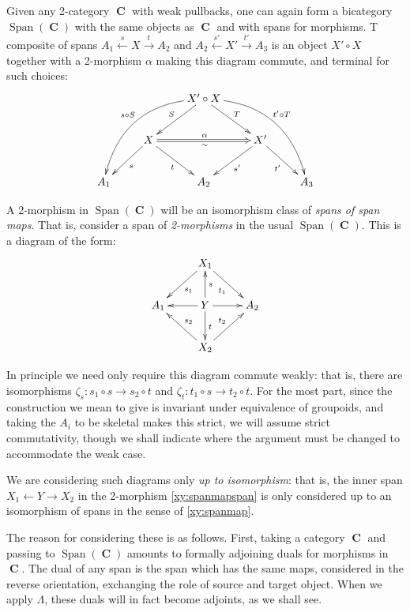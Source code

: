 \documentclass[10pt]{amsart}
\numberwithin{theorem}{subsection}
\newcommand{\ra}{\mathop{\rightarrow}}
\newcommand{\ralim}{\mathop{\ra}\limits}
\newcommand{\la}{\mathop{\leftarrow}}
\newcommand{\lalim}{\mathop{\la}\limits}
\newcommand{\opname}[1]{\operatorname{#1}}
\newcommand{\catname}[1]{\boldsymbol{\opname{{#1}}}}
\newcommand{\C}{\catname{C}}
\newcommand{\Span}{\opname{Span}}
\newcommand{\FV}{\Lambda}
\begin{document}
Given any 2-category $\C$ with weak pullbacks, one can again form a
bicategory $\Span(\C)$ with the same objects as $\C$ and with spans
for morphisms.  T composite of spans $A_1 \lalim^{s} X \ralim^{t} A_2$
and $A_2 \lalim^{s'} X' \ralim^{t'} A_3$ is an object $X' \circ X$
together with a 2-morphism $\alpha$ making this diagram commute, and
terminal for such choices:
\begin{equation}\label{xy:wkpb}
 \xymatrix{
   & & {X'\circ X} \ar_{S}[ld]\ar^{T}[rd]\ar@/_2pc/_{s \circ S}[ddll]\ar@/^2pc/^{t' \circ T}[ddrr] & & \\
   & {X}\ar^{s}[ld]\ar_{t}[rd] \ar@{=>}[rr]^{\alpha}_{\sim} & & {X'}\ar^{s'}[ld]\ar_{t'}[rd] & \\
   {A_1} & & {A_2} & & {A_3} \\
}
\end{equation}

A 2-morphism in $\Span(\C)$ will be an isomorphism class of
\textit{spans of span maps}.  That is, consider a span of
\textit{2-morphisms} in the usual $\Span(\C)$.  This is a diagram of
the form:
\begin{equation}\label{xy:spanmapspan}
\xymatrix{
  & X_1 \ar[dl]^{s_1}  \ar[dr]_{t_1} & \\
A_1 & Y \ar[l] \ar[r] \ar[d]^{t} \ar[u]_{s}& A_2 \\
  & X_2 \ar[ul]_{s_2}  \ar[ur]^{t_2} & \\
}
\end{equation}

In principle we need only require this diagram commute weakly: that
is, there are isomorphisms $\zeta_s : s_1 \circ s \ra s_2 \circ t$ and
$\zeta_t : t_1 \circ s \ra t_2 \circ t$.  For the most part, since the
construction we mean to give is invariant under equivalence of
groupoids, and taking the $A_i$ to be skeletal makes this strict, we
will assume strict commutativity, though we shall indicate where the
argument must be changed to accommodate the weak case.

We are considering such diagrams only \textit{up to isomorphism}: that
is, the inner span $X_1 \la Y \ra X_2$ in the 2-morphism
\ref{xy:spanmapspan} is only considered up to an isomorphism of spans
in the sense of \ref{xy:spanmap}.

The reason for considering these is as follows.  First, taking a
category $\C$ and passing to $\Span(\C)$ amounts to formally adjoining
duals for morphisms in $\C$.  The dual of any span is the span which
has the same maps, considered in the reverse orientation, exchanging
the role of source and target object.  When we apply $\FV$, these
duals will in fact become adjoints, as we shall see.
\end{document}
